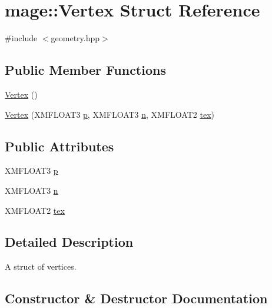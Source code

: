 \hypertarget{structmage_1_1_vertex}{}\section{mage\+:\+:Vertex Struct Reference}
\label{structmage_1_1_vertex}


{\ttfamily \#include $<$geometry.\+hpp$>$}

\subsection*{Public Member Functions}
\begin{DoxyCompactItemize}
\item 
\hyperlink{structmage_1_1_vertex_a8bf3578fcb5595eab057dc2d1f916dce}{Vertex} ()
\item 
\hyperlink{structmage_1_1_vertex_a19ef5e9829752aa2134bc25617ce910d}{Vertex} (X\+M\+F\+L\+O\+A\+T3 \hyperlink{structmage_1_1_vertex_a9d726a508934b3baccfb01ea912420e7}{p}, X\+M\+F\+L\+O\+A\+T3 \hyperlink{structmage_1_1_vertex_a0b6c65dd92ba473f490e790189d92daf}{n}, X\+M\+F\+L\+O\+A\+T2 \hyperlink{structmage_1_1_vertex_a85ae82408f02d64ae567a74efe151188}{tex})
\end{DoxyCompactItemize}
\subsection*{Public Attributes}
\begin{DoxyCompactItemize}
\item 
X\+M\+F\+L\+O\+A\+T3 \hyperlink{structmage_1_1_vertex_a9d726a508934b3baccfb01ea912420e7}{p}
\item 
X\+M\+F\+L\+O\+A\+T3 \hyperlink{structmage_1_1_vertex_a0b6c65dd92ba473f490e790189d92daf}{n}
\item 
X\+M\+F\+L\+O\+A\+T2 \hyperlink{structmage_1_1_vertex_a85ae82408f02d64ae567a74efe151188}{tex}
\end{DoxyCompactItemize}


\subsection{Detailed Description}
A struct of vertices. 

\subsection{Constructor \& Destructor Documentation}
\hypertarget{structmage_1_1_vertex_a8bf3578fcb5595eab057dc2d1f916dce}{}\label{structmage_1_1_vertex_a8bf3578fcb5595eab057dc2d1f916dce} 
